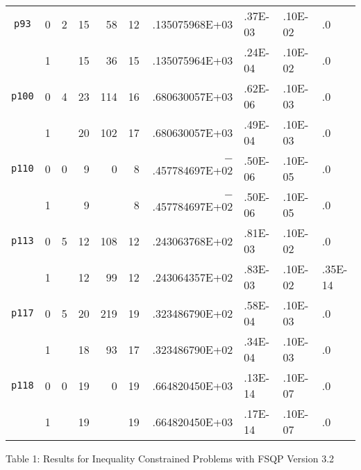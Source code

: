 {\begin{tabular}{ccccccrlll}
 {\tt p93} & 0 & 2  &  15  &  ~58  & 12 &   .135075968E+03 &.37E-03 & .10E-02 &
.0\\
           & 1 &    &  15  &  ~36  & 15 &   .135075964E+03 &.24E-04 & .10E-02 &
.0\\\hline
 {\tt p100}& 0 & 4  &  23  &   114 & 16 &   .680630057E+03 &.62E-06 & .10E-03 &
.0\\
           & 1 &    &  20  &   102 & 17 &   .680630057E+03 &.49E-04 & .10E-03 &
.0\\\hline
 {\tt p110}& 0 & 0  &  ~9  & ~~0   &~8  &$-$.457784697E+02 &.50E-06 & .10E-05 &
.0\\
           & 1 &    &  ~9  &       &~8  &$-$.457784697E+02 &.50E-06 & .10E-05 &
.0\\\hline
 {\tt p113}& 0 & 5  &  12  &  108  & 12 &   .243063768E+02 &.81E-03 & .10E-02 &
.0\\
           & 1 &    &  12  &  ~99  & 12 &   .243064357E+02 &.83E-03 & .10E-02 &
.35E-14\\\hline
 {\tt p117}& 0 & 5  &  20  &  219  & 19 &   .323486790E+02 &.58E-04 & .10E-03 &
.0\\
           & 1 &    &  18  &  ~93  & 17 &   .323486790E+02 &.34E-04 & .10E-03 &
.0\\\hline
 {\tt p118}& 0 & 0  &  19  &~~0    & 19 &   .664820450E+03 &.13E-14 & .10E-07 &
.0\\ 
           & 1 &    &  19  &       & 19 &   .664820450E+03 &.17E-14 & .10E-07 &
.0\\ 
\hline
\end{tabular}
}

\nopagebreak
\vspace{1em}
\hspace{4em}
Table 1: Results for Inequality Constrained Problems with FSQP Version 3.2

